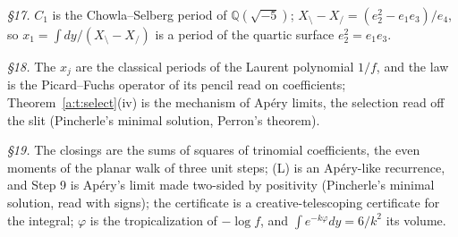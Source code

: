 \documentclass[11pt]{article}
\theoremstyle{plain}
\theoremstyle{definition}
\theoremstyle{remark}
\begin{document}
\noindent\emph{\S17.} $C_1$ is the Chowla--Selberg period of $\mathbb Q(\sqrt{-5})$; $X_{\setminus}-X_{/}=(e_2^2-e_1e_3)/e_4$, so $x_1=\int dy/(X_{\setminus}-X_{/})$ is a period of the quartic surface $e_2^2=e_1e_3$.

\noindent\emph{\S18.} The $x_j$ are the classical periods of the Laurent polynomial $1/f$, and the law is the Picard--Fuchs operator of its pencil read on coefficients; Theorem~\ref{a:t:select}(iv) is the mechanism of Ap\'ery limits, the selection read off the slit (Pincherle's minimal solution, Perron's theorem).

\noindent\emph{\S19.} The closings are the sums of squares of trinomial coefficients, the even moments of the planar walk of three unit steps; (L) is an Ap\'ery-like recurrence, and Step 9 is Ap\'ery's limit made two-sided by positivity (Pincherle's minimal solution, read with signs); the certificate is a creative-telescoping certificate for the integral; $\varphi$ is the tropicalization of $-\log f$, and $\int e^{-k\varphi}dy=6/k^2$ its volume.
\end{document}
